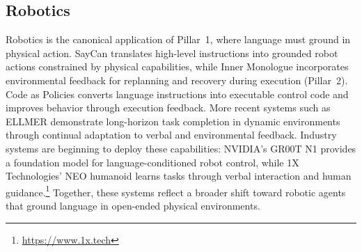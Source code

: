 \subsection{Robotics}
 
Robotics is the canonical application of Pillar~1, where language must ground in physical action. SayCan \citep{ahn2022can} translates high-level instructions into grounded robot actions constrained by physical capabilities, while Inner Monologue \citep{huang2022inner} incorporates environmental feedback for replanning and recovery during execution (Pillar~2). Code as Policies \citep{liang2022code} converts language instructions into executable control code and improves behavior through execution feedback. More recent systems such as ELLMER \citep{mon2025embodied} demonstrate long-horizon task completion in dynamic environments through continual adaptation to verbal and environmental feedback. Industry systems are beginning to deploy these capabilities: NVIDIA's GR00T N1 \citep{bjorck2025gr00t} provides a foundation model for language-conditioned robot control, while 1X Technologies' NEO humanoid learns tasks through verbal interaction and human guidance.\footnote{\url{https://www.1x.tech}} Together, these systems reflect a broader shift toward robotic agents that ground language in open-ended physical environments.





